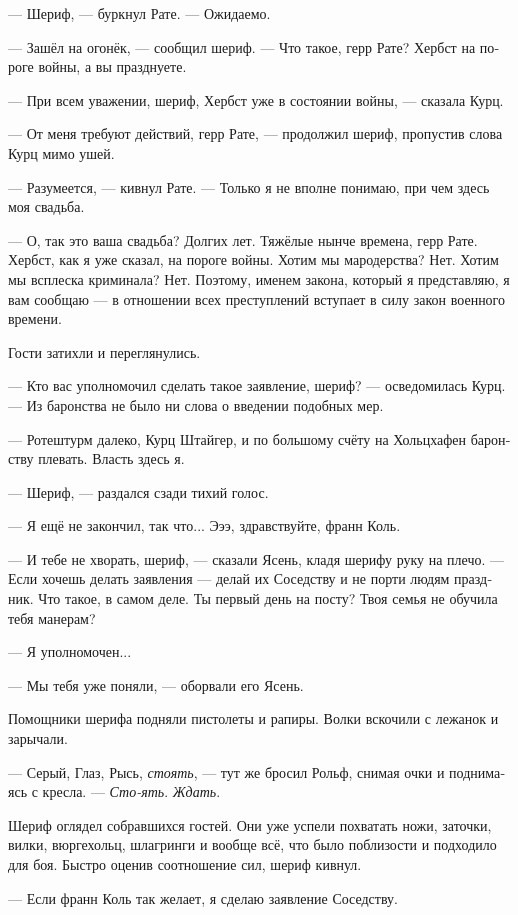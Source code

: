 \documentclass[a4paper,12pt,fleqn]{book}\usepackage{polyglossia}\setdefaultlanguage[babelshorthands=true]{russian}\setotherlanguage{english}\defaultfontfeatures{Ligatures=TeX,Mapping=tex-text}\usepackage{xcolor}\newcommand{\ml}[3]{#2}
\newcommand{\asterism}{\vspace{1em}{\centering\Large\bfseries$\ast~\ast~\ast$\par}\vspace{1em}}
\begin{document}
\asterism

--- Шериф, --- буркнул Рате.
--- Ожидаемо.

--- Зашёл на огонёк, --- сообщил шериф.
--- Что такое, герр Рате?
Хербст на пороге войны, а вы празднуете.

--- При всем уважении, шериф, Хербст уже в состоянии войны, --- сказала Курц.

--- От меня требуют действий, герр Рате, --- продолжил шериф, пропустив слова Курц мимо ушей.

--- Разумеется, --- кивнул Рате.
--- Только я не вполне понимаю, при чем здесь моя свадьба.

--- О, так это ваша свадьба?
Долгих лет.
Тяжёлые нынче времена, герр Рате.
Хербст, как я уже сказал, на пороге войны.
Хотим мы мародерства?
Нет.
Хотим мы всплеска криминала?
Нет.
Поэтому, именем закона, который я представляю, я вам сообщаю --- в отношении всех преступлений вступает в силу закон военного времени.

Гости затихли и переглянулись.

--- Кто вас уполномочил сделать такое заявление, шериф? --- осведомилась Курц.
--- Из баронства не было ни слова о введении подобных мер.

--- Ротештурм далеко, Курц Штайгер, и по большому счёту на Хольцхафен баронству плевать.
Власть здесь я.

--- Шериф, --- раздался сзади тихий голос.

--- Я ещё не закончил, так что...
Эээ, здравствуйте, франн Коль.

--- И тебе не хворать, шериф, --- сказали Ясень, кладя шерифу руку на плечо.
--- Если хочешь делать заявления --- делай их Соседству и не порти людям праздник.
Что такое, в самом деле.
Ты первый день на посту?
Твоя семья не обучила тебя манерам?

--- Я уполномочен...

--- Мы тебя уже поняли, --- оборвали его Ясень.

Помощники шерифа подняли пистолеты и рапиры.
Волки вскочили с лежанок и зарычали.

--- Серый, Глаз, Рысь, \textit{стоять}, --- тут же бросил Рольф, снимая очки и поднимаясь с кресла.
--- \textit{Сто-ять}.
\textit{Ждать}.

Шериф оглядел собравшихся гостей.
Они уже успели похватать ножи, заточки, вилки, вюргехольц, шлагринги и вообще всё, что было поблизости и подходило для боя.
Быстро оценив соотношение сил, шериф кивнул.

--- Если франн Коль так желает, я сделаю заявление Соседству.
\end{document}
